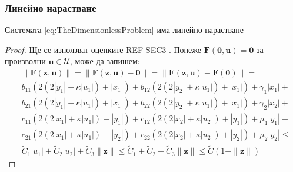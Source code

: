 \subsubsection{Линейно нарастване}
\begin{proposition}
  Системата \ref{eq:TheDimensionlessProblem} има линейно нарастване
\end{proposition}

\begin{proof}
  Ще се използват оценките \color{Red} REF SEC3 \color{Black}.
  Понеже $\mathbf{F}(\mathbf{0}, \mathbf{u}) = \mathbf{0}$ за произволни $\mathbf{u} \in \mathscr{U}$, може да запишем:
  \begin{equation}
    \begin{split}
      &\|\mathbf{F}(\mathbf{z}, \mathbf{u})\| = \|\mathbf{F}(\mathbf{z}, \mathbf{u}) - \mathbf{0}\| = \|\mathbf{F}(\mathbf{z}, \mathbf{u}) - \mathbf{F}(\mathbf{0})\| = \\
      &b_{11} (2 (2 |y_1| + \kappa |u_1|) + |x_1|) + b_{12}(2  (2 |y_2| + \kappa |u_1|) +  |x_1|) + \gamma_1 |x_1| + \\
      &b_{21} (2  (2|y_1| +  \kappa |u_1|) +  |x_1|) + b_{22} (2  (2|y_2| +  \kappa |u_1|) +  |x_1|) + \gamma_2 |x_2| + \\
      &c_{11}(2  (2|x_1| +  \kappa |u_1|) +  |y_1|) + c_{12} (2  (2|x_2| +  \kappa |u_2|) +  |y_1|) + \mu_1 |y_1| + \\
      &c_{21} (2  (2|x_1| +  \kappa |u_1|) +  |y_2|) + c_{22} (2  (2|x_2| +  \kappa |u_2|) +  |y_2|) + \mu_2 |y_2| \leq \\
      &\tilde{C}_1|u_1| + \tilde{C}_2|u_2| + \tilde{C}_3 \|\mathbf{z}\| \leq \tilde{C}_1 + \tilde{C}_2 + \tilde{C}_3 \|\mathbf{z}\| \leq \tilde{C}(1 + \|\mathbf{z}\|)
    \end{split}
  \end{equation}

\end{proof}

